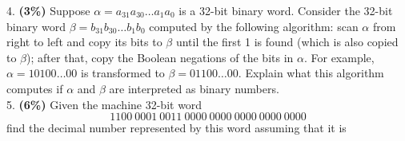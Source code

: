 \documentclass[11pt]{article}
\begin{document}
\bigskip
\noindent
%
4. {\bf (3\%)} Suppose $\alpha = a_{31} a_{30} \dots a_1 a_0$ is a 32-bit binary word. Consider the 32-bit binary 
word $\beta = b_{31} b_{30} \dots b_1 b_0$ computed by the following algorithm: scan $\alpha$ from right 
to left and copy its bits to $\beta$ until the first 1 is found (which is also copied to $\beta$); after that, 
copy the Boolean negations of the bits in $\alpha$. For example, $\alpha = 10100\dots 00$ is transformed to $\beta = 01100\dots 00$. Explain what this algorithm computes if $\alpha$ and $\beta$ are interpreted as binary numbers.
\linebreak
\linebreak
{}
\\
\newpage
\bigskip
\noindent
%
5. {\bf (6\%)} Given the machine 32-bit word
%
$$
1100 \ 0001\ 0011 \ 0000 \ 0000 \ 0000\ 0000 \ 0000
$$
%
find the decimal number represented by this word assuming that it is
%
\end{document}
